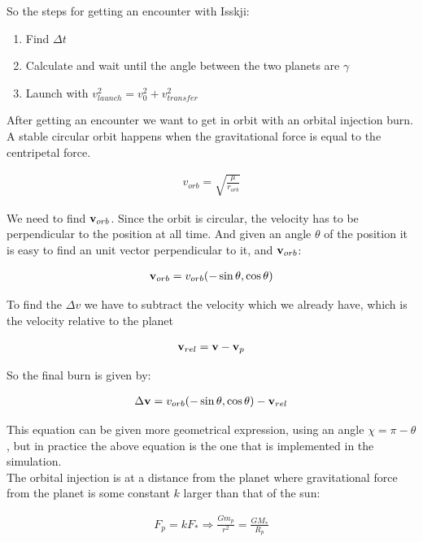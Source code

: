 \documentclass[a4paper, 10pt]{article}
\begin{document}
So the steps for getting an encounter with Isskji:

\begin{enumerate}
\item Find $\Delta t$
\item Calculate and wait until the angle between the two planets are $\gamma$
\item Launch with $v_{launch}^2 = v_0^2 + v_{transfer}^2$ 
\end{enumerate}


After getting an encounter we want to get in orbit with an orbital injection burn. A stable circular orbit happens when the gravitational force is equal to the centripetal force.

\begin{align}
v_{orb} = \sqrt{\frac{\mu}{r_{orb}}}
\end{align}

We need to find $\bold{v}_{orb}$. Since the orbit is circular, the velocity has to be perpendicular to the position at all time. And given an angle $\theta$ of the position it is easy to find an unit vector perpendicular to it, and $\bold{v}_{orb}$:

\begin{align}
\bold{v}_{orb} = v_{orb}(-\sin\theta,\cos\theta)
\end{align}

To find the $\Delta v$ we have to subtract the velocity which we already have, which is the velocity relative to the planet

\begin{align}
\bold{v}_{rel} = \bold{v} - \bold{v}_p
\end{align} 

So the final burn is given by:

\begin{align}
\Delta \bold{v} = v_{orb}(-\sin\theta,\cos\theta) - \bold{v}_{rel}
\end{align}

This equation can be given more geometrical expression, using an angle $\chi = \pi - \theta$, but in practice the above equation is the one that is implemented in the simulation.\\

The orbital injection is at a distance from the planet where gravitational force from the planet is some constant $k$ larger than that of the sun:

\begin{align}
F_p = kF_* \Rightarrow \frac{Gm_p}{r^2} = \frac{GM_*}{R_p}
\end{align}
\end{document}
